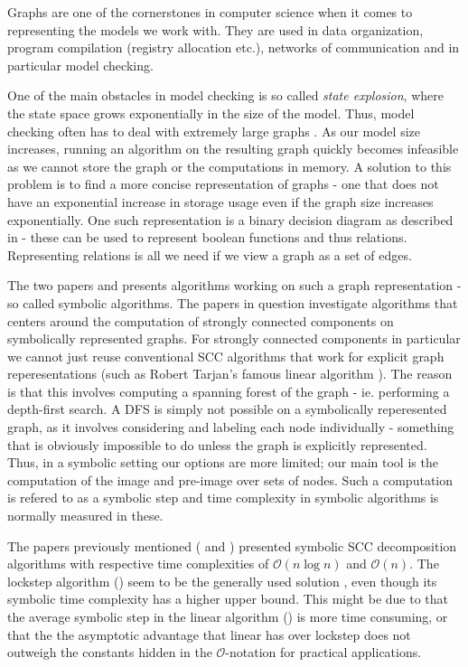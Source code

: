 \documentclass[../master/master.tex]{subfiles}
\begin{document}
Graphs are one of the cornerstones in computer science when it comes to representing the models we work with. They are used in data organization,  program compilation (registry allocation etc.), networks of communication and in particular model checking.

One of the main obstacles in model checking is so called \textit{state explosion}, where the state space grows exponentially in the size of the model. Thus, model checking often has to deal with extremely large graphs \cite{pelanek_2004}. As our model size increases, running an algorithm on the resulting graph quickly becomes infeasible as we cannot store the graph or the computations in memory. A solution to this problem is to find a more concise representation of graphs - one that does not have an exponential increase in storage usage even if the graph size increases exponentially. One such representation is a binary decision diagram as described in \cite{bryant_1992} - these can be used to represent boolean functions and thus relations. Representing relations is all we need if we view a graph as a set of edges.

The two papers \cite{linear} and \cite{lockstep} presents algorithms working on such a graph representation - so called symbolic algorithms. The papers in question investigate algorithms that centers around the computation of strongly connected components on symbolically represented graphs. For strongly connected components in particular we cannot just reuse conventional SCC algorithms that work for explicit graph reperesentations (such as Robert Tarjan's famous linear algorithm \cite{tarjan_1971}). The reason is that this involves computing a spanning forest of the graph - ie. performing a depth-first search. A DFS is simply not possible on a symbolically reperesented graph, as it involves considering and labeling each node individually - something that is obviously impossible to do unless the graph is explicitly represented. Thus, in a symbolic setting our options are more limited; our main tool is the computation of the image and pre-image over sets of nodes. Such a computation is refered to as a symbolic step and time complexity in symbolic algorithms is normally measured in these.

The papers previously mentioned (\cite{linear} and \cite{lockstep}) presented symbolic SCC decomposition algorithms with respective time complexities of $\mathcal{O}(n \log n)$ and $\mathcal{O}(n)$. The lockstep algorithm (\cite{lockstep}) seem to be the generally used solution , even though its symbolic time complexity has a higher upper bound. This might be due to that the average symbolic step in the linear algorithm (\cite{linear}) is more time consuming, or that the the asymptotic advantage that linear has over lockstep does not outweigh the constants hidden in the $\mathcal{O} $-notation for practical applications.
\end{document}
